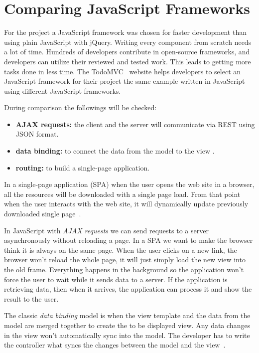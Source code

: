 \chapter{Comparing JavaScript Frameworks}

For the project a JavaScript framework was chosen for faster development than using plain JavaScript with jQuery. Writing every component from scratch needs a lot of time. Hundreds of developers contribute in open-source frameworks, and developers can utilize their reviewed and tested work. This leads to getting more tasks done in less time. The TodoMVC~\cite{TodoMVC} website helps developers to select an JavaScript framework for their project the same example written in JavaScript using different JavaScript frameworks.

During comparison the followings will be checked:
\begin{itemize}
	\item \textbf{AJAX requests:} the client and the server  will communicate via REST using JSON format.
	\item \textbf{data binding:} to connect the data from the model to the view .
	\item \textbf{routing:} to build a single-page application.
\end{itemize}


In a single-page application (SPA) when the user opens the web site in a browser, all the resources will be downloaded with a single page load. From that point when the user interacts with the web site, it will dynamically update previously downloaded single page~\cite{SPA}.

In JavaScript with \emph{AJAX requests} we can send requests to a server asynchronously without reloading a page. In a SPA we want to make the browser think it is always on the same page. When the user clicks on a new link, the browser won't reload the whole page, it will just simply load the new view into the old frame. Everything happens in the background so the application won't force the user to wait while it sends data to a server. If the application is retrieving data, then when it arrives, the application can process it and show the result to the user.

The classic \emph{data binding} model is when the view template and the data from the model are merged together to create the to be displayed view. Any data changes in the view won't automatically sync into the model. The developer has to write the controller what syncs the changes between the model and the view~\cite{Angular-Developer-DataBinding}.


